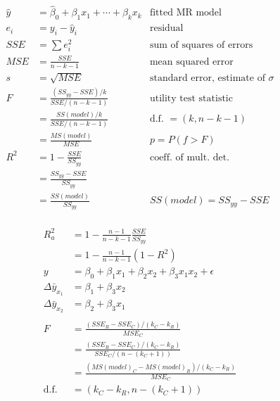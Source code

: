 \documentclass[12pt, landscape]{article}
\begin{document}
\begin{multicols}{2}
\setlength{\abovedisplayskip}{0pt}
\setlength{\belowdisplayskip}{0pt}
\setlength{\abovedisplayshortskip}{0pt}
\setlength{\belowdisplayshortskip}{0pt}
\begin{align*}
    \hat{y} &= \hat{\beta}_0 + \beta_1 x_1 + \dotsm + \beta_k x_k &\text{fitted MR model} \\
    e_i &= y_i - \hat{y}_i &\text{residual} \\
    SSE &= \sum{e_i^2} &\text{sum of squares of errors} \\
    MSE &= \frac{SSE}{n - k - 1} &\text{mean squared error} \\
    s &= \sqrt{MSE} &\text{standard error, estimate of }\sigma \\
    F &= \frac{(SS_{yy} - SSE) / k}{SSE / (n - k - 1)} &\text{utility test statistic} \\
      &= \frac{SS(model)/k}{SSE / (n - k - 1)} &\text{d.f. } = (k, n - k - 1) \\
      &= \frac{MS(model)}{MSE} & p = P(f > F) \\
    R^2 &= 1 - \frac{SSE}{SS_{yy}} &\text{coeff. of mult. det.} \\
        &= \frac{SS_{yy}-SSE}{SS_{yy}} \\
        &= \frac{SS(model)}{SS_{yy}} & SS(model) = SS_{yy} - SSE\\
\end{align*}

\begin{align*}
    R_a^2 &= 1 - \frac{n-1}{n-k-1} \frac{SSE}{SS_{yy}} \\
          &= 1 - \frac{n-1}{n-k-1} (1 - R^2) \\
    y &= \beta_0 + \beta_1 x_1 + \beta_2 x_2 + \beta_3 x_1 x_2 + \epsilon \\
    \Delta \bar{y}_{x_1} &= \beta_1 + \beta_3 x_2 \\
    \Delta \bar{y}_{x_2} &= \beta_2 + \beta_3 x_1 \\
    \\
    F &= \frac{(SSE_R - SSE_C)/(k_C - k_R)}{MSE_C} \\
      &= \frac{(SSE_R - SSE_C)/(k_C - k_R)}{SSE_C/(n-(k_C+1))}\\
      &= \frac{(MS(model)_C - MS(model)_R)/(k_C - k_R)}{MSE_C}\\
    \text{d.f.} &= (k_C - k_R, n-(k_C+1))
\end{align*}

\end{multicols}
\end{document}
